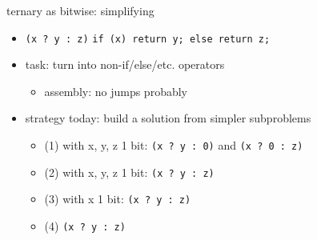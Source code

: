 \begin{frame}[fragile,label=ternarySimplifyOptions]{ternary as bitwise: simplifying}
    \begin{itemize}
    \item \lstinline|(x ? y : z)| {\small \lstinline|if (x) return y; else return z;|}
    \item task: turn into non-if/else/etc. operators
        \begin{itemize}
        \item assembly: no jumps probably
        \end{itemize}
    \vspace{.5cm}
    \item strategy today: build a solution from simpler subproblems
        \begin{itemize}
        \item (1) with x, y, z 1 bit: \lstinline|(x ? y : 0)| and \lstinline|(x ? 0 : z)|
        \item (2) with x, y, z 1 bit: \lstinline|(x ? y : z)|
        \item (3) with x 1 bit: \lstinline|(x ? y : z)|
        \item (4) \lstinline|(x ? y : z)|
        \end{itemize}
    \end{itemize}
\end{frame}
